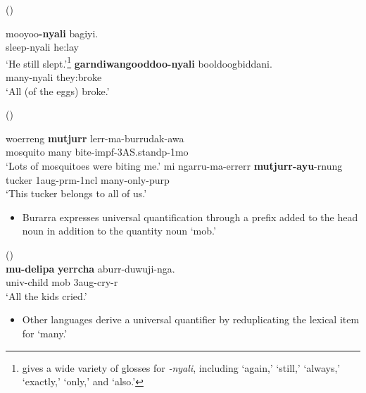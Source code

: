 \documentclass{article}
\begin{document}
\begin{exe}
   (\citealt[463-464]{mcgregor90})
  \begin{xlist}
    \ex \gll mooyoo\textbf{-nyali} bagiyi.\\
    sleep-{\sc nyali} he:lay\\
    \glt `He still slept.'\footnote{\cite{mcgregor90} gives a wide variety of glosses for {\it -nyali}, including `again,' `still,' `always,' `exactly,' `only,' and `also.'}
    \ex \gll \textbf{garndiwangooddoo-nyali} booldoogbiddani.\\
    many-{\sc nyali} they:broke\\
    \glt `All (of the eggs) broke.'
  \end{xlist}
   (\citealt[]{zandvoort99})
  \begin{xlist}
    \ex \gll woerreng \textbf{mutjurr} lerr-ma-burrudak-awa\\
    mosquito many bite-{\sc impf}-3AS.stand{\sc p}-1{\sc mo}\\
    \glt `Lots of mosquitoes were biting me.'%
    \ex \gll mi ngarru-ma-errerr \textbf{mutjurr-ayu}-rnung\\
    tucker 1{\sc aug-prm}-1{\sc ncl} many-only-{\sc purp}\\
    \glt `This tucker belongs to all of us.'%

  \end{xlist}
\end{exe}

\begin{itemize}
\item Burarra expresses universal quantification through a prefix added to the head noun in addition to the quantity noun `mob.'
\end{itemize}

\begin{exe}
   (\citealt[34]{green87}) \\
  \gll \textbf{mu-delipa}     \textbf{yerrcha}     aburr-duwuji-nga.\\
  {\sc univ}-child    mob        3{\sc aug}-cry-{\sc r}\\
  \glt `All the kids cried.'
\end{exe}

\begin{itemize}
\item Other languages derive a universal quantifier by reduplicating the lexical item for `many.'
\end{itemize}
\end{document}
